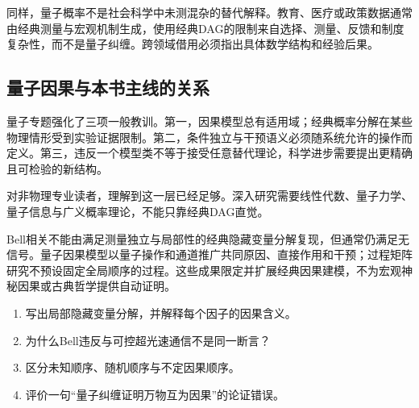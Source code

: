 同样，量子概率不是社会科学中未测混杂的替代解释。教育、医疗或政策数据通常由经典测量与宏观机制生成，使用经典DAG的限制来自选择、测量、反馈和制度复杂性，而不是量子纠缠。跨领域借用必须指出具体数学结构和经验后果。

\subsection{量子因果与本书主线的关系}

量子专题强化了三项一般教训。第一，因果模型总有适用域；经典概率分解在某些物理情形受到实验证据限制。第二，条件独立与干预语义必须随系统允许的操作而定义。第三，违反一个模型类不等于接受任意替代理论，科学进步需要提出更精确且可检验的新结构。

对非物理专业读者，理解到这一层已经足够。深入研究需要线性代数、量子力学、量子信息与广义概率理论，不能只靠经典DAG直觉。

\begin{chapterreview}
Bell相关不能由满足测量独立与局部性的经典隐藏变量分解复现，但通常仍满足无信号。量子因果模型以量子操作和通道推广共同原因、直接作用和干预；过程矩阵研究不预设固定全局顺序的过程。这些成果限定并扩展经典因果建模，不为宏观神秘因果或古典哲学提供自动证明。
\end{chapterreview}

\begin{selfcheck}
\begin{enumerate}
  \item 写出局部隐藏变量分解，并解释每个因子的因果含义。
  \item 为什么Bell违反与可控超光速通信不是同一断言？
  \item 区分未知顺序、随机顺序与不定因果顺序。
  \item 评价一句“量子纠缠证明万物互为因果”的论证错误。
\end{enumerate}
\end{selfcheck}
